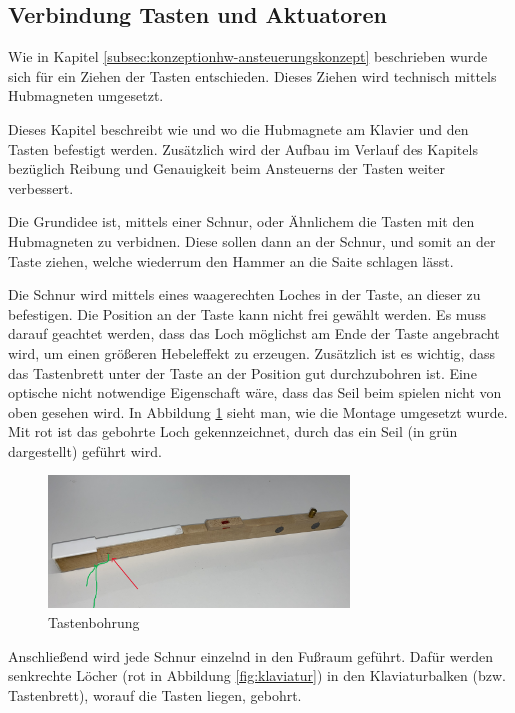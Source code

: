 \subsection{Verbindung Tasten und Aktuatoren} \label{subsec:VerbindungTastenAktuatoren}

Wie in Kapitel \ref{subsec:konzeptionhw-ansteuerungskonzept} beschrieben wurde sich für ein Ziehen der Tasten entschieden.
Dieses Ziehen wird technisch mittels Hubmagneten umgesetzt. \newline

Dieses Kapitel beschreibt wie und wo die Hubmagnete am Klavier und den Tasten befestigt werden.
Zusätzlich wird der Aufbau im Verlauf des Kapitels bezüglich Reibung und Genauigkeit beim Ansteuerns der Tasten weiter verbessert.
\newline

Die Grundidee ist, mittels einer Schnur, oder Ähnlichem die Tasten mit den Hubmagneten zu verbidnen.
Diese sollen dann an der Schnur, und somit an der Taste ziehen, welche wiederrum den Hammer an die Saite schlagen lässt.

Die Schnur wird mittels eines waagerechten Loches in der Taste, an dieser zu befestigen.
Die Position an der Taste kann nicht frei gewählt werden.
Es muss darauf geachtet werden, dass das Loch möglichst am Ende der Taste angebracht wird, um einen größeren Hebeleffekt zu erzeugen.
Zusätzlich ist es wichtig, dass das Tastenbrett unter der Taste an der Position gut durchzubohren ist.
Eine optische nicht notwendige Eigenschaft wäre, dass das Seil beim spielen nicht von oben gesehen wird.
In Abbildung \ref{img:Tastenbohrung} sieht man, wie die Montage umgesetzt wurde.
Mit rot ist das gebohrte Loch gekennzeichnet, durch das ein Seil (in grün dargestellt) geführt wird.

\begin{figure}[htbp]
    \centering
    \includegraphics[width=8cm]{img/Taste_schraeg.jpg}
    \caption{Tastenbohrung}
    \label{img:Tastenbohrung}
\end{figure}


Anschließend wird jede Schnur einzelnd in den Fußraum geführt.
Dafür werden senkrechte Löcher (rot in Abbildung \ref{fig:klaviatur}) in den Klaviaturbalken (bzw. Tastenbrett),
worauf die Tasten liegen, gebohrt.

